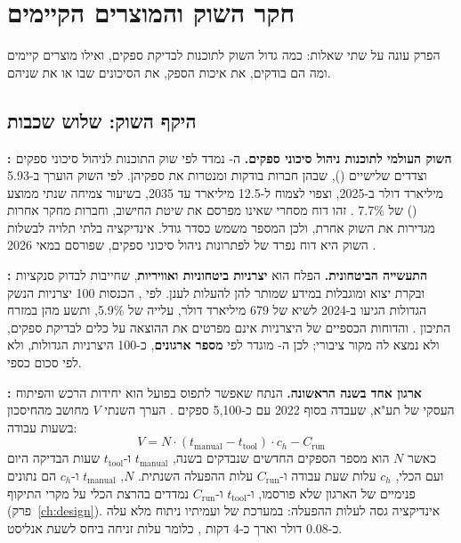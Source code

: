 \chapter{חקר השוק והמוצרים הקיימים}\label{ch:market}

הפרק עונה על שתי שאלות: כמה גדול השוק לתוכנות לבדיקת ספקים, ואילו מוצרים קיימים ומה הם בודקים, את איכות הספק, את הסיכונים שבו או את שניהם.

\section{היקף השוק: שלוש שכבות}\label{sec:tam}

\textbf{: השוק העולמי לתוכנות ניהול סיכוני ספקים.} ה- נמדד לפי שוק התוכנות לניהול סיכוני ספקים וצדדים שלישיים (), שבהן חברות בודקות ומנטרות את ספקיהן. לפי  השוק הוערך ב-5.93 מיליארד דולר ב-2025, וצפוי לצמוח ל-12.5 מיליארד עד 2035, בשיעור צמיחה שנתי ממוצע () של 7.7\% \cite{wiseguy2026}. זהו דוח מסחרי שאינו מפרסם את שיטת החישוב, וחברות מחקר אחרות מגדירות את השוק אחרת, ולכן המספר משמש כסדר גודל. אינדיקציה בלתי תלויה לבשלות השוק היא דוח  נפרד של  לפתרונות ניהול סיכוני ספקים, שפורסם במאי 2026 \cite{everstream2026}.

\textbf{: התעשייה הביטחונית.} הפלח הוא \textbf{יצרניות ביטחוניות ואוויריות}, שחייבות לבדוק סנקציות ובקרת יצוא ומוגבלות במידע שמותר להן להעלות לענן. לפי , הכנסות 100 יצרניות הנשק הגדולות הגיעו ב-2024 לשיא של 679 מיליארד דולר, עלייה של 5.9\%, ותשע מהן במזרח התיכון \cite{sipri2025}.  והדוחות הכספיים של היצרניות אינם מפרטים את ההוצאה על כלים לבדיקת ספקים, ולא נמצא לה מקור ציבורי; לכן ה- מוגדר לפי \textbf{מספר ארגונים}, כ-100 היצרניות הגדולות, ולא לפי סכום כספי.

\textbf{: ארגון אחד בשנה הראשונה.} הנתח שאפשר לתפוס בפועל הוא יחידות הרכש והפיתוח העסקי של תע"א, שעבדה בסוף 2022 עם כ-5,100 ספקים \cite{mevaker2024}. הערך השנתי $V$ מחושב מהחיסכון בשעות עבודה:
\begin{equation}\label{eq:som}
V = N \cdot \left(t_{\mathrm{manual}} - t_{\mathrm{tool}}\right) \cdot c_{h} - C_{\mathrm{run}}
\end{equation}
כאשר $N$ הוא מספר הספקים החדשים שנבדקים בשנה, $t_{\mathrm{manual}}$ ו-$t_{\mathrm{tool}}$ שעות הבדיקה היום ועם הכלי, $c_{h}$ עלות שעת עבודה ו-$C_{\mathrm{run}}$ עלות ההפעלה השנתית. $N$, $t_{\mathrm{manual}}$ ו-$c_{h}$ הם נתונים פנימיים של הארגון שלא פורסמו, ו-$t_{\mathrm{tool}}$ ו-$C_{\mathrm{run}}$ נמדדים בהרצת הכלי על מקרי התיקוף (פרק~\ref{ch:design}). אינדיקציה גסה לעלות ההפעלה: במערכת של  ועמיתיו ניתוח מלא עלה כ-0.08 דולר וארך כ-4 דקות \cite{almahri2026}, כלומר עלות זניחה ביחס לשעת אנליסט.

